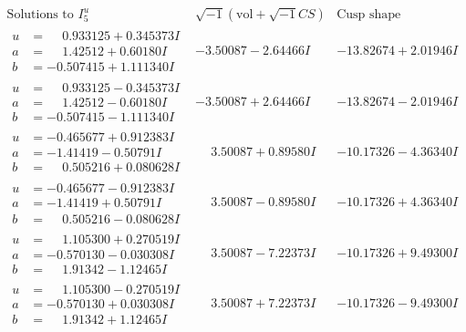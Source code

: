\documentclass[1p]{elsarticle_modified}
\theoremstyle{definition}
\newcommand{\I}{\sqrt{-1}}
\begin{document}
$$\begin{array}{c|c|c}  
\text{Solutions to }I^u_{5}& \I (\text{vol} + \sqrt{-1}CS) & \text{Cusp shape}\\
 \hline 
\begin{aligned}
u &= \phantom{-}0.933125 + 0.345373 I \\
a &= \phantom{-}1.42512 + 0.60180 I \\
b &= -0.507415 + 1.111340 I\end{aligned}
 & -3.50087 - 2.64466 I & -13.82674 + 2.01946 I \\ \hline\begin{aligned}
u &= \phantom{-}0.933125 - 0.345373 I \\
a &= \phantom{-}1.42512 - 0.60180 I \\
b &= -0.507415 - 1.111340 I\end{aligned}
 & -3.50087 + 2.64466 I & -13.82674 - 2.01946 I \\ \hline\begin{aligned}
u &= -0.465677 + 0.912383 I \\
a &= -1.41419 - 0.50791 I \\
b &= \phantom{-}0.505216 + 0.080628 I\end{aligned}
 & \phantom{-}3.50087 + 0.89580 I & -10.17326 - 4.36340 I \\ \hline\begin{aligned}
u &= -0.465677 - 0.912383 I \\
a &= -1.41419 + 0.50791 I \\
b &= \phantom{-}0.505216 - 0.080628 I\end{aligned}
 & \phantom{-}3.50087 - 0.89580 I & -10.17326 + 4.36340 I \\ \hline\begin{aligned}
u &= \phantom{-}1.105300 + 0.270519 I \\
a &= -0.570130 - 0.030308 I \\
b &= \phantom{-}1.91342 - 1.12465 I\end{aligned}
 & \phantom{-}3.50087 - 7.22373 I & -10.17326 + 9.49300 I \\ \hline\begin{aligned}
u &= \phantom{-}1.105300 - 0.270519 I \\
a &= -0.570130 + 0.030308 I \\
b &= \phantom{-}1.91342 + 1.12465 I\end{aligned}
 & \phantom{-}3.50087 + 7.22373 I & -10.17326 - 9.49300 I \\ \hline\begin{aligned}

\end{aligned}
\end{array}$$
\end{document}
